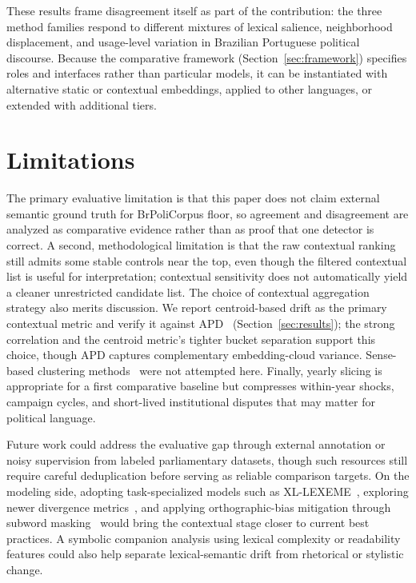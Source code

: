 \documentclass[12pt]{article}
\begin{document}
These results frame disagreement itself as part of the contribution: the three method families respond to different mixtures of lexical salience, neighborhood displacement, and usage-level variation in Brazilian Portuguese political discourse. Because the comparative framework
(Section~\ref{sec:framework}) specifies roles and interfaces rather than
particular models, it can be instantiated with alternative static or
contextual embeddings, applied to other languages, or extended with
additional tiers.

\section{Limitations}
\label{sec:limitations}

The primary evaluative limitation is that this paper does not claim external semantic ground truth for BrPoliCorpus floor, so agreement and disagreement are analyzed as comparative evidence rather than as proof that one detector is correct. A second, methodological limitation is that the raw contextual ranking still admits some stable controls near the top, even though the filtered contextual list is useful for interpretation; contextual sensitivity does not automatically yield a cleaner unrestricted candidate list. The choice of contextual aggregation strategy also merits discussion. We report centroid-based drift as the primary contextual metric and verify it against APD~\cite{giulianelli-etal-2020-analysing,periti-tahmasebi-2024-systematic} (Section~\ref{sec:results}); the strong correlation and the centroid metric's tighter bucket separation support this choice, though APD captures complementary embedding-cloud variance. Sense-based clustering methods~\cite{montariol-etal-2021-scalable} were not attempted here. Finally, yearly slicing is appropriate for a first comparative baseline but compresses within-year shocks, campaign cycles, and short-lived institutional disputes that may matter for political language.

Future work could address the evaluative gap through external annotation or noisy supervision from labeled parliamentary datasets, though such resources still require careful deduplication before serving as reliable comparison targets. On the modeling side, adopting task-specialized
models such as XL-LEXEME~\cite{cassotti-etal-2023-xl}, exploring newer divergence metrics~\cite{rachinskiy-schlechtweg-2025-rethinking}, and applying orthographic-bias mitigation through subword masking~\cite{laicher-etal-2021-explaining} would bring the contextual stage closer to current best practices. A symbolic companion analysis using lexical complexity or readability features could also help separate lexical-semantic drift from rhetorical or stylistic change.
\end{document}
